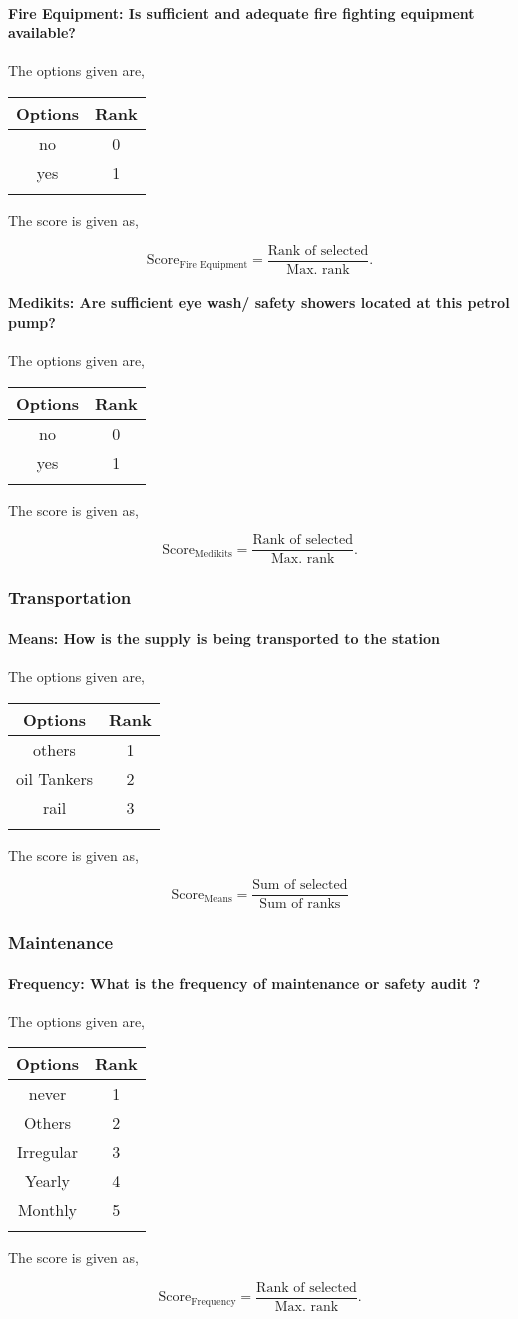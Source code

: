 \documentclass[oneside,twocolumn]{article}
\newcommand{\tsub}[2]{\text{#1}_{\text{#2}}}
\newcommand{\dsub}[2]{\dfrac{\text{#1}}{\text{#2}}}
\newcommand{\multsel}[1]
{
	\[
		\tsub{Score}{#1} = \dsub{Sum of selected}{Sum of ranks}
	\]
}
\newcommand{\singsel}[1]
{
	\[
		\tsub{Score}{#1} = \dsub{Rank of selected}{Max. rank}.
	\]
}
\newenvironment{ttable}
{
\begin{center}
\begin{tabular}{c|c}
\hline
}
{
\\ \hline
\end{tabular}
\end{center}
}
\begin{document}
\paragraph{Fire Equipment: Is sufficient and adequate fire fighting equipment available?}

The options given are,
\begin{ttable}
Options & Rank \\ \hline
no & 0 \\
yes & 1 \\
\hline
\end{ttable}
The score is given as,
\singsel{Fire Equipment}
\paragraph{Medikits: Are sufficient eye wash/ safety showers located at this petrol pump?}

The options given are,
\begin{ttable}
Options & Rank \\ \hline
no & 0 \\
yes & 1 \\
\hline
\end{ttable}
The score is given as,
\singsel{Medikits}
\subsubsection{Transportation}

\paragraph{Means: How is the supply is being transported to the station}

The options given are,
\begin{ttable}
Options & Rank \\ \hline
others & 1 \\
oil Tankers & 2 \\
rail & 3 \\
\hline
\end{ttable}
The score is given as,
\multsel{Means}
\subsubsection{Maintenance}

\paragraph{Frequency: What is the frequency of  maintenance or safety audit ?}

The options given are,
\begin{ttable}
Options & Rank \\ \hline
never & 1 \\
Others & 2 \\
Irregular & 3 \\
Yearly & 4 \\
Monthly & 5 \\
\hline
\end{ttable}
The score is given as,
\singsel{Frequency}
\end{document}
